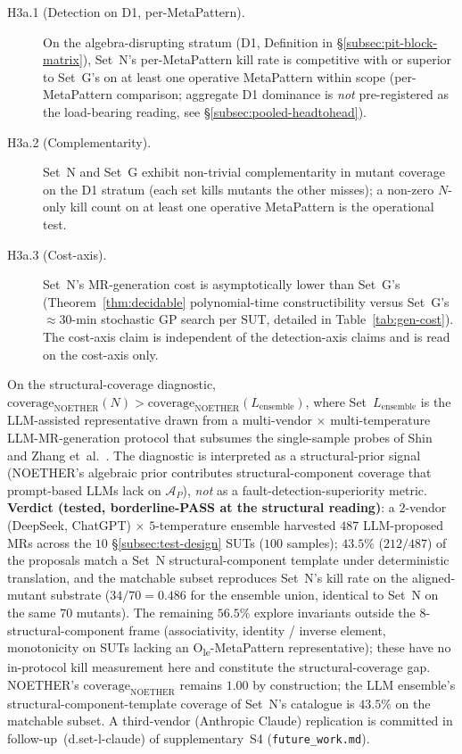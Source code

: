 \documentclass[acmsmall,screen,review]{acmart}
\begin{document}
\begin{description}
\begin{description}
    \item[H3a.1 (Detection on D1, per-MetaPattern).] On the
      algebra-disrupting stratum (D1, Definition in
      \S\ref{subsec:pit-block-matrix}), Set~N's per-MetaPattern kill rate
      is competitive with or superior to Set~G's on at least one
      operative MetaPattern within scope (per-MetaPattern comparison; aggregate
      D1 dominance is \emph{not} pre-registered as the load-bearing
      reading, see \S\ref{subsec:pooled-headtohead}).
    \item[H3a.2 (Complementarity).] Set~N and Set~G exhibit
      non-trivial complementarity in mutant coverage on the D1
      stratum (each set kills mutants the other misses); a
      non-zero $N$-only kill count on at least one operative MetaPattern
      is the operational test.
    \item[H3a.3 (Cost-axis).] Set~N's MR-generation cost is
      asymptotically lower than Set~G's
      (Theorem~\ref{thm:decidable} polynomial-time constructibility
      versus Set~G's $\approx 30$-min stochastic GP search per SUT,
      detailed in Table~\ref{tab:gen-cost}). The cost-axis claim is
      independent of the detection-axis claims and is read on the
      cost-axis only.
  \end{description}
  \item[Pre-registered hypothesis (H3b, vs LLM-assisted baseline).] On the structural-coverage diagnostic, $\mathrm{coverage}_{\mathrm{NOETHER}}(N) > \mathrm{coverage}_{\mathrm{NOETHER}}(L_{\mathrm{ensemble}})$, where Set~$L_{\mathrm{ensemble}}$ is the LLM-assisted representative drawn from a multi-vendor $\times$ multi-temperature LLM-MR-generation protocol that subsumes the single-sample probes of Shin~\cite{Shin2024} and Zhang et~al.~\cite{ZhangChatGPTMR2023}. The diagnostic is interpreted as a structural-prior signal (NOETHER's algebraic prior contributes structural-component coverage that prompt-based LLMs lack on $\mathcal{A}_P$), \emph{not} as a fault-detection-superiority metric. \textbf{Verdict (tested, borderline-PASS at the structural reading)}: a $2$-vendor (DeepSeek, ChatGPT) $\times$ $5$-temperature ensemble harvested $487$ LLM-proposed MRs across the $10$ \S\ref{subsec:test-design} SUTs ($100$ samples); $43.5\%$ ($212/487$) of the proposals match a Set~N structural-component template under deterministic translation, and the matchable subset reproduces Set~N's kill rate on the aligned-mutant substrate ($34/70 = 0.486$ for the ensemble union, identical to Set~N on the same $70$ mutants). The remaining $56.5\%$ explore invariants outside the $8$-structural-component frame (associativity, identity / inverse element, monotonicity on SUTs lacking an O\textsubscript{le}-MetaPattern representative); these have no in-protocol kill measurement here and constitute the structural-coverage gap. NOETHER's $\mathrm{coverage}_{\mathrm{NOETHER}}$ remains $1.00$ by construction; the LLM ensemble's structural-component-template coverage of Set~N's catalogue is $43.5\%$ on the matchable subset. A third-vendor (Anthropic Claude) replication is committed in follow-up~(d.set-l-claude) of supplementary~S4 (\texttt{future\_work.md}).

\end{description}
\end{document}
